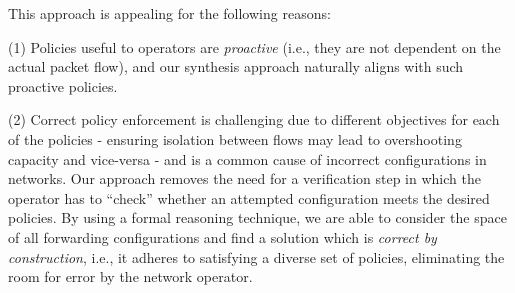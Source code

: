 This approach is appealing for the following reasons: 

(1)
Policies useful to operators are \emph{proactive} (i.e., they are not
dependent on the actual packet flow), and our synthesis approach
naturally aligns with such proactive policies.


(2) Correct policy enforcement is challenging due to different
objectives for each of the policies - ensuring isolation between flows
may lead to overshooting capacity and vice-versa - and is a common
cause of incorrect configurations in networks.  Our approach removes
the need for a verification step in which the operator has to
``check'' whether an attempted configuration meets the desired
policies.  By using a formal reasoning technique, we are able to
consider the space of all forwarding configurations and find a
solution which is \emph{correct by construction}, i.e., it adheres to
satisfying a diverse set of policies, eliminating the room for error
by the network operator.

